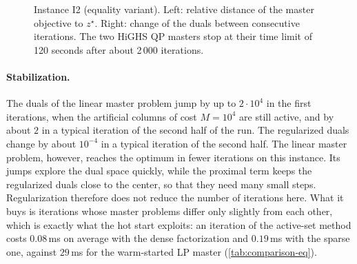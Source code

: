 \begin{figure}[ht]
\centering
{}
\caption{Instance I2 (equality variant). Left: relative distance of the master objective to
$z^\star$. Right: change of the duals between consecutive iterations. The two HiGHS QP masters
stop at their time limit of 120 seconds after about 2\,000 iterations.}
\label{fig:convergence}
\end{figure}

\paragraph{Stabilization.} The duals of the linear master problem jump by up to $2\cdot10^4$
in the first iterations, when the artificial columns of cost $M = 10^4$ are still active, and
by about $2$ in a typical iteration of the second half of the run. The regularized duals change
by about $10^{-4}$ in a typical iteration of the second half. The linear master problem,
however, reaches the optimum in fewer iterations on this instance. Its jumps explore the dual
space quickly, while the proximal term keeps the regularized duals close to the center, so
that they need many small steps. Regularization therefore does not reduce the number of
iterations here. What it buys is iterations whose master problems differ only slightly from
each other, which is exactly what the hot start exploits: an iteration of the active-set
method costs $0.08$\,ms on average with the dense factorization and $0.19$\,ms with the
sparse one, against $29$\,ms for the warm-started LP master (\cref{tab:comparison-eq}).

